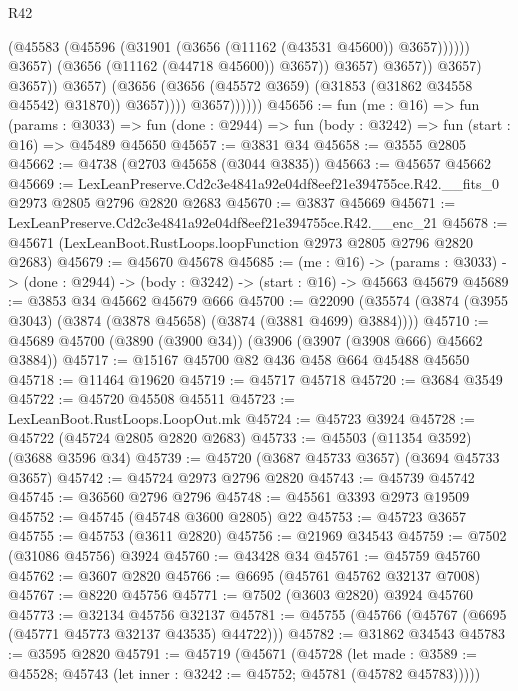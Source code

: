 \begin{lexlean}{R42}
\begin{coremodule}
                                            (@45583
                                              (@45596
                                                (@31901 (@3656 (@11162 (@43531 @45600)) @3657))))))
                                        @3657)
                                      (@3656 (@11162 (@44718 @45600)) @3657))
                                    @3657)
                                  @3657))
                              @3657)
                            @3657))
                        @3657)
                      (@3656 (@3656 (@45572 @3659) (@31853 (@31862 @34558 @45542) @31870)) @3657))))
                @3657))))))
@45656 := fun (me : @16) =>
  fun (params : @3033) =>
  fun (done : @2944) => fun (body : @3242) => fun (start : @16) => @45489 @45650
@45657 := @3831 @34
@45658 := @3555 @2805
@45662 := @4738 (@2703 @45658 (@3044 @3835))
@45663 := @45657 @45662
@45669 := LexLeanPreserve.Cd2c3e4841a92e04df8eef21e394755ce.R42.__fits_0
    @2973
    @2805
    @2796
    @2820
    @2683
@45670 := @3837 @45669
@45671 := LexLeanPreserve.Cd2c3e4841a92e04df8eef21e394755ce.R42.__enc_21
@45678 := @45671 (LexLeanBoot.RustLoops.loopFunction @2973 @2805 @2796 @2820 @2683)
@45679 := @45670 @45678
@45685 := (me : @16) ->
  (params : @3033) -> (done : @2944) -> (body : @3242) -> (start : @16) -> @45663 @45679
@45689 := @3853 @34 @45662 @45679 @666
@45700 := @22090 (@35574 (@3874 (@3955 @3043) (@3874 (@3878 @45658) (@3874 (@3881 @4699) @3884))))
@45710 := @45689 @45700 (@3890 (@3900 @34)) (@3906 (@3907 (@3908 @666) @45662 @3884))
@45717 := @15167 @45700 @82 @436 @458 @664 @45488 @45650
@45718 := @11464 @19620
@45719 := @45717 @45718
@45720 := @3684 @3549
@45722 := @45720 @45508 @45511
@45723 := LexLeanBoot.RustLoops.LoopOut.mk
@45724 := @45723 @3924
@45728 := @45722 (@45724 @2805 @2820 @2683)
@45733 := @45503 (@11354 @3592) (@3688 @3596 @34)
@45739 := @45720 (@3687 @45733 @3657) (@3694 @45733 @3657)
@45742 := @45724 @2973 @2796 @2820
@45743 := @45739 @45742
@45745 := @36560 @2796 @2796
@45748 := @45561 @3393 @2973 @19509
@45752 := @45745 (@45748 @3600 @2805) @22
@45753 := @45723 @3657
@45755 := @45753 (@3611 @2820)
@45756 := @21969 @34543
@45759 := @7502 (@31086 @45756) @3924
@45760 := @43428 @34
@45761 := @45759 @45760
@45762 := @3607 @2820
@45766 := @6695 (@45761 @45762 @32137 @7008)
@45767 := @8220 @45756
@45771 := @7502 (@3603 @2820) @3924 @45760
@45773 := @32134 @45756 @32137
@45781 := @45755 (@45766 (@45767 (@6695 (@45771 @45773 @32137 @43535) @44722)))
@45782 := @31862 @34543
@45783 := @3595 @2820
@45791 := @45719
    (@45671
      (@45728
        (let made : @3589 := @45528; @45743 (let inner : @3242 := @45752; @45781 (@45782 @45783)))))

\end{coremodule}
\end{lexlean}
